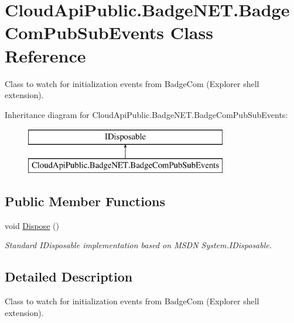 \hypertarget{class_cloud_api_public_1_1_badge_n_e_t_1_1_badge_com_pub_sub_events}{\section{Cloud\-Api\-Public.\-Badge\-N\-E\-T.\-Badge\-Com\-Pub\-Sub\-Events Class Reference}
\label{class_cloud_api_public_1_1_badge_n_e_t_1_1_badge_com_pub_sub_events}
}


Class to watch for initialization events from Badge\-Com (Explorer shell extension).  


Inheritance diagram for Cloud\-Api\-Public.\-Badge\-N\-E\-T.\-Badge\-Com\-Pub\-Sub\-Events\-:\begin{figure}[H]
\begin{center}
\leavevmode
\includegraphics[height=2.000000cm]{class_cloud_api_public_1_1_badge_n_e_t_1_1_badge_com_pub_sub_events}
\end{center}
\end{figure}
\subsection*{Public Member Functions}
\begin{DoxyCompactItemize}
\item 
void \hyperlink{class_cloud_api_public_1_1_badge_n_e_t_1_1_badge_com_pub_sub_events_afd8ebb3dd0bcfa8b9430697c06d9bbfa}{Dispose} ()
\begin{DoxyCompactList}\small\item\em Standard I\-Disposable implementation based on M\-S\-D\-N System.\-I\-Disposable. \end{DoxyCompactList}\end{DoxyCompactItemize}


\subsection{Detailed Description}
Class to watch for initialization events from Badge\-Com (Explorer shell extension). 



